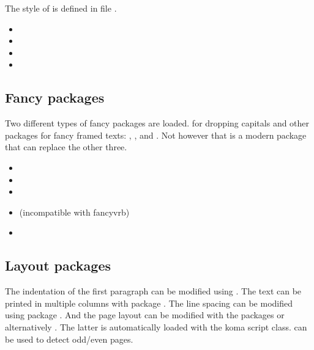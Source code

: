 The style of  is defined in file 
.

\begin{itemize}[noitemsep]
\item {}
\item {}
\item {}
\item {}
\end{itemize}


\subsection{Fancy packages}

Two different types of fancy packages are loaded.  for dropping capitals and other packages for fancy framed texts: , ,  and . Not however that  is a modern package that can replace the other three.

\begin{itemize}[noitemsep]
\item {} 
\item {}
\item {}
\item {} (incompatible with fancyvrb)
\item {}
\end{itemize}


\subsection{Layout packages}

The indentation of the first paragraph can be modified using . The text can be printed in multiple columns with package . The line spacing can be modified using package 
. And the page layout can be modified with the packages  or alternatively . The latter is automatically loaded with the koma script class.  can be used to detect odd/even pages.

